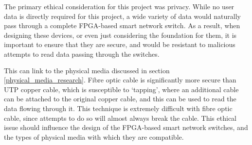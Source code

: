 
The primary ethical consideration for this project was privacy. While no user data is directly required for this project, a wide variety of data would naturally pass through a complete FPGA-based smart network switch.
As a result, when designing these devices, or even just considering the foundation for them, it is important to ensure that they are secure, and would be resistant to malicious attempts to read data passing through the switches.

This can link to the physical media discussed in section \ref{physical_media_research}. Fibre optic cable is significantly more secure than UTP copper cable, which is susceptible to `tapping', where an additional cable can be attached to the original copper cable, and this can be used to read the data flowing through it. This technique is extremely difficult with fibre optic cable, since attempts to do so will almost always break the cable.
This ethical issue should influence the design of the FPGA-based smart network switches, and the types of physical media with which they are compatible.
